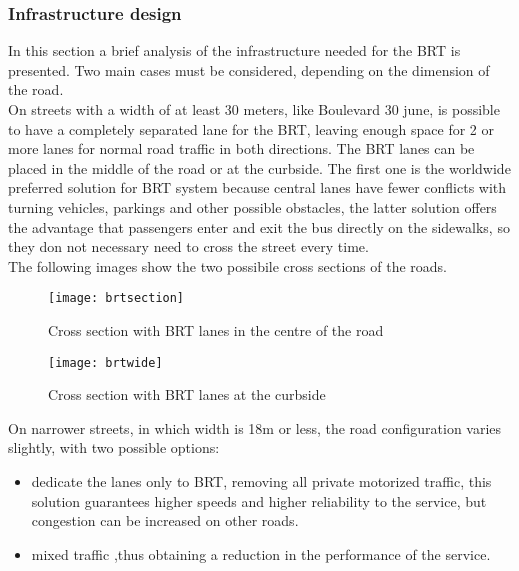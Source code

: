 \documentclass{article}
\begin{document}
\subsubsection{Infrastructure design}
In this section a brief analysis of the infrastructure needed for the BRT is presented. Two main cases must be considered, depending on the dimension of the road.\\
On streets with a width of at least 30 meters, like Boulevard 30 june, is possible to have a completely separated lane for the BRT, leaving enough space for 2 or more lanes for normal road traffic in both directions. The BRT lanes can be placed in the middle of the road or at the curbside. The first one is the worldwide preferred solution for BRT system because central lanes have fewer conflicts with turning vehicles, parkings and other possible obstacles, the latter solution offers the advantage that passengers enter and exit the bus directly on the sidewalks, so they don not necessary need to cross the street every time.\\
The following images show the two possibile cross sections of the roads.
\begin{figure}[H]
\texttt{[image: brtsection]}
\caption{Cross section with BRT lanes in the centre of the road}
\end{figure} 
\begin{figure}[H]
\texttt{[image: brtwide]}
\caption{Cross section with BRT lanes at the curbside}
\end{figure} 
On narrower streets, in which width is 18m or less, the road configuration varies slightly, with two possible options:
\begin{itemize}
\item dedicate the lanes only to BRT, removing all private motorized traffic, this solution guarantees higher speeds and higher reliability to the service, but congestion can be increased on other roads.
\item mixed traffic ,thus obtaining a reduction in the performance of the service.
\end{itemize}
\begin{figure}[H]
\end{figure} 
\newpage
\end{document}
